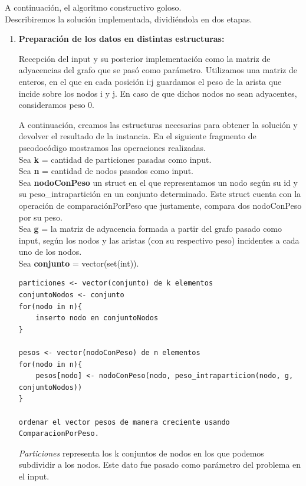 \documentclass[10pt,a4paper]{article}
\begin{document}
A continuación, el algoritmo constructivo goloso.\\
Describiremos la solución implementada, dividiéndola en dos etapas.

\bigskip
\begin{enumerate}
\item


\textbf{Preparación de los datos en distintas estructuras:} 

Recepción del input y su posterior implementación como la matriz de adyacencias del grafo que se pasó como parámetro. Utilizamos una matriz de enteros, en el que en cada posición i:j guardamos el peso de la arista que incide sobre los nodos i y j. En caso de que dichos nodos no sean adyacentes, consideramos peso 0.

A continuación, creamos las estructuras necesarias para obtener la solución y devolver el resultado de la instancia. En el siguiente fragmento de pseodocódigo mostramos las operaciones realizadas.\\

Sea \textbf{k} = cantidad de particiones pasadas como input.\\
Sea \textbf{n} = cantidad de nodos pasados como input.\\
Sea \textbf{nodoConPeso} un struct en el que representamos un nodo según su id y su peso\_intrapartición en un conjunto determinado. Este struct cuenta con la operación de comparaciónPorPeso que justamente, compara dos nodoConPeso por su peso.\\
Sea \textbf{g} = la matriz de adyacencia formada a partir del grafo pasado como input, según los nodos y las aristas (con su respectivo peso) incidentes a cada uno de los nodos.\\
Sea \textbf{conjunto} = vector(set(int)).\\
\newpage

\begin{lstlisting}[mathescape]
particiones <- vector(conjunto) de k elementos
conjuntoNodos <- conjunto
for(nodo in n){
	inserto nodo en conjuntoNodos
}

pesos <- vector(nodoConPeso) de n elementos
for(nodo in n){
	pesos[nodo] <- nodoConPeso(nodo, peso_intraparticion(nodo, g, conjuntoNodos))
}

ordenar el vector pesos de manera creciente usando ComparacionPorPeso.
\end{lstlisting}


\textit{Particiones} representa los k conjuntos de nodos en los que podemos subdividir a los nodos. Este dato fue pasado como parámetro del problema en el input.


\end{enumerate}
\end{document}
